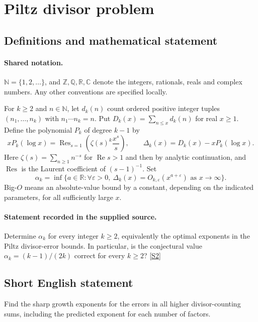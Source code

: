 \documentclass[11pt]{article}
\newcommand{\sref}[2]{\hyperlink{source:#1:#2}{[S#2]}}
\begin{document}
\section{Piltz divisor problem}\label{statement}

\subsection{Definitions and mathematical statement}

\paragraph{Shared notation.}$\mathbb N=\{1,2,\ldots\}$, and $\mathbb Z,\mathbb Q,\mathbb R,\mathbb C$ denote the integers, rationals, reals and complex numbers. Any other conventions are specified locally.


For $k\ge2$ and $n\in\mathbb N$, let $d_k(n)$ count ordered positive integer tuples $(n_1,\ldots,n_k)$ with $n_1\cdots n_k=n$. Put $D_k(x)=\sum_{n\le x}d_k(n)$ for real $x\ge1$. Define the polynomial $P_k$ of degree $k-1$ by
\[
xP_k(\log x)=\operatorname{Res}_{s=1}\left(\zeta(s)^k\frac{x^s}{s}\right),\qquad
\Delta_k(x)=D_k(x)-xP_k(\log x).
\]
Here $\zeta(s)=\sum_{n\ge1}n^{-s}$ for $\operatorname{Re}s>1$ and then by analytic continuation, and $\operatorname{Res}$ is the Laurent coefficient of $(s-1)^{-1}$. Set
\[
\alpha_k=\inf\{a\in\mathbb R:\forall\varepsilon>0,\ \Delta_k(x)=O_{k,\varepsilon}(x^{a+\varepsilon})\text{ as }x\to\infty\}.
\]
Big-$O$ means an absolute-value bound by a constant, depending on the indicated parameters, for all sufficiently large $x$.
\paragraph{Statement recorded in the supplied source.}
Determine $\alpha_k$ for every integer $k\ge2$, equivalently the optimal exponents in the Piltz divisor-error bounds. In particular, is the conjectural value $\alpha_k=(k-1)/(2k)$ correct for every $k\ge2$? \sref{statement}{2}
\subsection{Short English statement}
Find the sharp growth exponents for the errors in all higher divisor-counting sums, including the predicted exponent for each number of factors.
\end{document}
